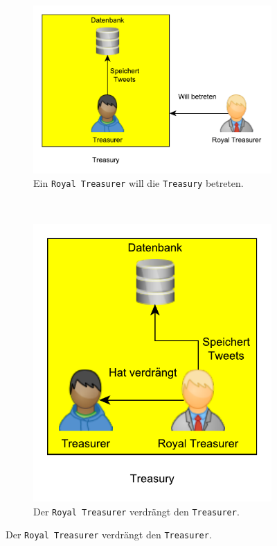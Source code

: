 \begin{figure}[h!]
\begin{subfigure}[t]{0.5\textwidth}
\includegraphics[width=\textwidth]{Bilder/Daemon/RoyalTreasurer1.pdf}
\caption{Ein \texttt{Royal Treasurer} will die \texttt{Treasury} betreten.}
\label{fig:royal_treasurer1}
\end{subfigure}
~
\begin{subfigure}[t]{0.3\textwidth}
\includegraphics[width=\textwidth]{Bilder/Daemon/RoyalTreasurer2.pdf}
\caption{Der \texttt{Royal Treasurer} verdrängt den \texttt{Treasurer}.}
\label{fig:royal_treasurer2}
\end{subfigure}


\end{figure}
